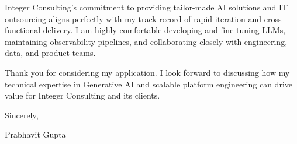 \documentclass[a4paper,11pt]{article}
\begin{document}
Integer Consulting’s commitment to providing tailor-made AI solutions and IT outsourcing aligns perfectly with my track record of rapid iteration and cross-functional delivery. I am highly comfortable developing and fine-tuning LLMs, maintaining observability pipelines, and collaborating closely with engineering, data, and product teams.

Thank you for considering my application. I look forward to discussing how my technical expertise in Generative AI and scalable platform engineering can drive value for Integer Consulting and its clients.

Sincerely,

Prabhavit Gupta
\end{document}
